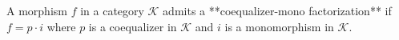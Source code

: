 A morphism $f$ in a category $\mathcal{K}$ admits a **coequalizer-mono factorization** if $f = p \cdot i$ where $p$ is a coequalizer in $\mathcal{K}$ and $i$ is a monomorphism in $\mathcal{K}$.
